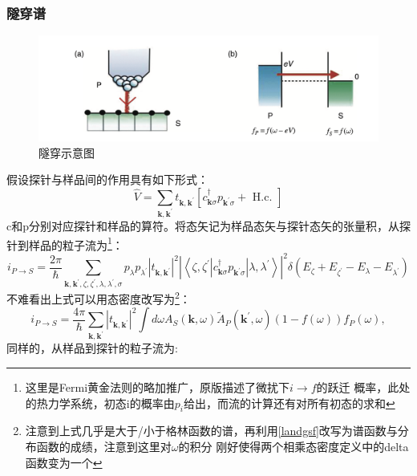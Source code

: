 \documentclass[10pt,openany]{book}
\theoremstyle{thmstyle} %
\theoremstyle{defstyle} %
\theoremstyle{prostyle} %
\begin{document}
\subsubsection{隧穿谱}
\begin{figure}[htbp]
	\centering
	\includegraphics*[scale=0.7]{Figures/Tunneling.png}
	\caption{隧穿示意图}
\end{figure}
假设探针与样品间的作用具有如下形式：
\begin{equation}
	\hat{V}=\sum_{\mathbf{k}, \mathbf{k}^{\prime}} t_{\mathbf{k}, \mathbf{k}^{\prime}}\left[c_{\mathbf{k} \sigma}^{\dagger} p_{\mathbf{k}^{\prime} \sigma}+\text { H.c. }\right]
\end{equation}
c和p分别对应探针和样品的算符。将态矢记为样品态矢与探针态矢的张量积，从探针到样品的粒子流为\footnote{这里是Fermi黄金法则的略加推广，原版描述了微扰下$ i\to f $的跃迁
概率，此处的热力学系统，初态i的概率由$ p_i $给出，而流的计算还有对所有初态的求和  }：
\begin{equation}
	i_{P \rightarrow S}=\frac{2 \pi}{\hbar} \sum_{\mathbf{k}, \mathbf{k}^{\prime}, \zeta, \zeta^{\prime}, \lambda, \lambda^{\prime}, \sigma} p_\lambda p_{\lambda^{\prime}}\left|t_{\mathbf{k}, \mathbf{k}^{\prime}}\right|^2\left|\left\langle\zeta, \zeta^{\prime}\left|c_{\mathbf{k} \sigma}^{\dagger} p_{\mathbf{k}^{\prime} \sigma}\right| \lambda, \lambda^{\prime}\right\rangle\right|^2 \delta\left(E_\zeta+E_{\zeta^{\prime}}-E_\lambda-E_{\lambda^{\prime}}\right)
\end{equation}
不难看出上式可以用态密度改写为\footnote{注意到上式几乎是大于/小于格林函数的谱，再利用\eqref{landgsf}改写为谱函数与分布函数的成绩，注意到这里对$ \omega $的积分
刚好使得两个相乘态密度定义中的delta函数变为一个 }：
\begin{equation}
	i_{P \rightarrow S}=\frac{4 \pi}{\hbar} \sum_{\mathbf{k}, \mathbf{k}^{\prime}}\left|t_{\mathbf{k}, \mathbf{k}^{\prime}}\right|^2 \int d \omega A_S(\mathbf{k}, \omega) \tilde{A}_P\left(\mathbf{k}^{\prime}, \omega\right)(1-f(\omega)) f_P(\omega),
\end{equation}
同样的，从样品到探针的粒子流为:
\end{document}

